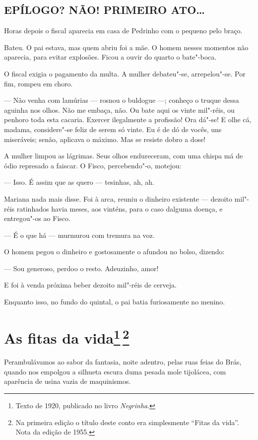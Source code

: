 \section*{EPÍLOGO? NÃO! PRIMEIRO ATO\ldots{}}

Horas depois o fiscal aparecia em casa de Pedrinho com o pequeno pelo
braço.

Bateu. O pai estava, mas quem abriu foi a mãe. O homem nesses momentos
não aparecia, para evitar explosões. Ficou a ouvir do quarto o
bate"-boca.

O fiscal exigia o pagamento da multa. A mulher debateu"-se, arrepelou"-se.
Por fim, rompeu em choro.

--- Não venha com lamúrias --- rosnou o buldogue ---; conheço o truque
dessa aguinha nos olhos. Não me embaça, não. Ou bate aqui os vinte
mil"-réis, ou penhoro toda esta cacaria. Exercer ilegalmente a profissão!
Ora dá"-se! E olhe cá, madama, considere"-se feliz de serem só vinte. Eu é
de dó de vocês, uns miseráveis; senão, aplicava o máximo. Mas se resiste
dobro a dose!

A mulher limpou as lágrimas. Seus olhos endureceram, com uma chispa má
de ódio represado a faiscar. O Fisco, percebendo"-o, motejou:

--- Isso. É assim que as quero --- tesinhas, ah, ah.

Mariana nada mais disse. Foi à arca, reuniu o dinheiro existente ---
dezoito mil"-réis ratinhados havia meses, aos vinténs, para o caso
dalguma doença, e entregou"-os ao Fisco.

--- É o que há --- murmurou com tremura na voz.

O homem pegou o dinheiro e gostosamente o afundou no bolso, dizendo:

--- Sou generoso, perdoo o resto. Adeuzinho, amor!

E foi à venda próxima beber dezoito mil"-réis de cerveja.

Enquanto isso, no fundo do quintal, o pai batia furiosamente no menino.

\chapter{As fitas da vida\footnote[*]{Texto de 1920, publicado no livro \emph{Negrinha}.}\,\footnote[**]{Na primeira   edição o título deste conto era simplesmente ``Fitas da vida''. Nota da edição de 1955.}}

Perambulávamos ao sabor da fantasia, noite adentro, pelas ruas feias do
Brás, quando nos empolgou a silhueta escura duma pesada mole tijolácea,
com aparência de usina vazia de maquinismos.

